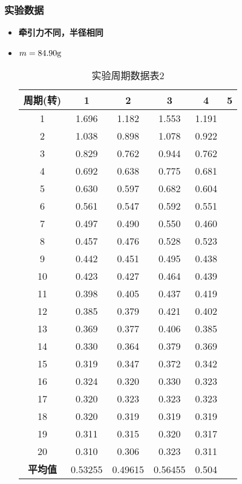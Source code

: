 \documentclass[12pt,hyperref,a4paper,UTF8]{ctexart}
\begin{document}
\subsubsection{实验数据}
    \begin{itemize}
        \item \textbf{牵引力不同，半径相同}
            \item $m=84.90\text g$
            
                \begin{table}[h!]
                \centering
                \begin{tabular}{cccccc}
                \toprule
                \textbf{周期(转)} & \textbf{1} & \textbf{2} & \textbf{3} & \textbf{4} & \textbf{5} \\
                \midrule
                1  & 1.696 & 1.182 & 1.553 & 1.191 \\
                2  & 1.038 & 0.898 & 1.078 & 0.922 \\
                3  & 0.829 & 0.762 & 0.944 & 0.762 \\
                4  & 0.692 & 0.638 & 0.775 & 0.681 \\
                5  & 0.630 & 0.597 & 0.682 & 0.604 \\
                6  & 0.561 & 0.547 & 0.592 & 0.551 \\
                7  & 0.497 & 0.490 & 0.550 & 0.460 \\
                8  & 0.457 & 0.476 & 0.528 & 0.523 \\
                9  & 0.442 & 0.451 & 0.495 & 0.438 \\
                10 & 0.423 & 0.427 & 0.464 & 0.439 \\
                11 & 0.398 & 0.405 & 0.437 & 0.419 \\
                12 & 0.385 & 0.379 & 0.421 & 0.402 \\
                13 & 0.369 & 0.377 & 0.406 & 0.385 \\
                14 & 0.330 & 0.364 & 0.379 & 0.369 \\
                15 & 0.319 & 0.347 & 0.372 & 0.342 \\
                16 & 0.324 & 0.320 & 0.330 & 0.323 \\
                17 & 0.320 & 0.323 & 0.323 & 0.323 \\
                18 & 0.320 & 0.319 & 0.319 & 0.319 \\
                19 & 0.311 & 0.315 & 0.320 & 0.317 \\
                20 & 0.310 & 0.306 & 0.323 & 0.311 \\
                \midrule
                \textbf{平均值} & 0.53255 & 0.49615 & 0.56455 & 0.504 \\
                \bottomrule
                \end{tabular}
                \caption{实验周期数据表2}
                \end{table}


\end{itemize}
\end{document}
